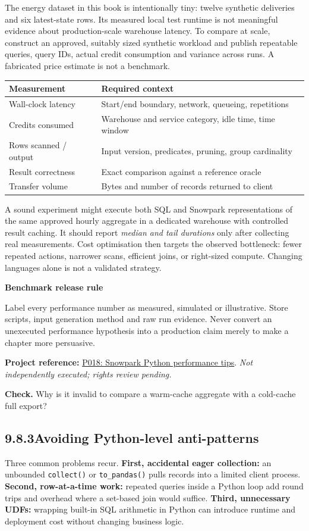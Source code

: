 \documentclass[11pt,twoside]{article}
\newcommand{\topic}[2]{\subsection*{#1\quad #2}}
\newcommand{\repo}[2]{\par\begingroup\fontsize{8.0}{9.6}\selectfont\sffamily\color{inkgray}\textbf{Project reference:} \href{#2}{#1}. \textit{Not independently executed; rights review pending.}\par\endgroup}
\begin{document}
The energy dataset in this book is intentionally tiny: twelve synthetic deliveries and six latest-state rows. Its measured local test runtime is not meaningful evidence about production-scale warehouse latency. To compare at scale, construct an approved, suitably sized synthetic workload and publish repeatable queries, query IDs, actual credit consumption and variance across runs. A fabricated price estimate is not a benchmark.
\begin{center}\renewcommand{\arraystretch}{1.1}\begin{tabularx}{\linewidth}{@{}p{28mm}X@{}}\toprule
\textbf{Measurement}&\textbf{Required context}\\\midrule
Wall-clock latency&Start/end boundary, network, queueing, repetitions\\
Credits consumed&Warehouse and service category, idle time, time window\\
Rows scanned / output&Input version, predicates, pruning, group cardinality\\
Result correctness&Exact comparison against a reference oracle\\
Transfer volume&Bytes and number of records returned to client\\\bottomrule
\end{tabularx}\end{center}
A sound experiment might execute both SQL and Snowpark representations of the same approved hourly aggregate in a dedicated warehouse with controlled result caching. It should report \emph{median and tail durations} only after collecting real measurements. Cost optimisation then targets the observed bottleneck: fewer repeated actions, narrower scans, efficient joins, or right-sized compute. Changing languages alone is not a validated strategy.
\begin{insight}\textbf{Benchmark release rule}\par
Label every performance number as measured, simulated or illustrative. Store scripts, input generation method and raw run evidence. Never convert an unexecuted performance hypothesis into a production claim merely to make a chapter more persuasive.\end{insight}
\repo{P018: Snowpark Python performance tips}{https://github.com/Snowflake-Labs/sfguide-snowpark-python-top-three-tips-for-optimal-performance}
\textbf{Check.} Why is it invalid to compare a warm-cache aggregate with a cold-cache full export?
\newpage
\topic{9.8.3}{Avoiding Python-level anti-patterns}
Three common problems recur. \textbf{First, accidental eager collection:} an unbounded \texttt{collect()} or \texttt{to\_pandas()} pulls records into a limited client process. \textbf{Second, row-at-a-time work:} repeated queries inside a Python loop add round trips and overhead where a set-based join would suffice. \textbf{Third, unnecessary UDFs:} wrapping built-in SQL arithmetic in Python can introduce runtime and deployment cost without changing business logic.
\end{document}
